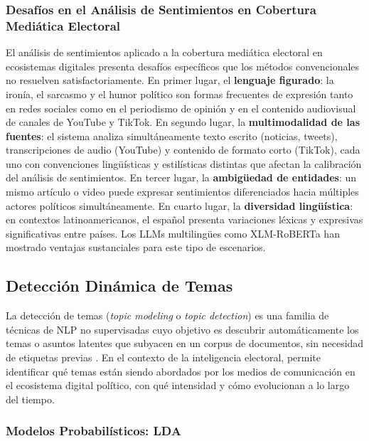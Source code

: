 \subsubsection{Desafíos en el Análisis de Sentimientos en Cobertura Mediática Electoral}

El análisis de sentimientos aplicado a la cobertura mediática electoral en ecosistemas digitales presenta desafíos específicos que los métodos convencionales no resuelven satisfactoriamente. En primer lugar, el \textbf{lenguaje figurado}: la ironía, el sarcasmo y el humor político son formas frecuentes de expresión tanto en redes sociales como en el periodismo de opinión y en el contenido audiovisual de canales de YouTube y TikTok. En segundo lugar, la \textbf{multimodalidad de las fuentes}: el sistema analiza simultáneamente texto escrito (noticias, tweets), transcripciones de audio (YouTube) y contenido de formato corto (TikTok), cada uno con convenciones lingüísticas y estilísticas distintas que afectan la calibración del análisis de sentimientos. En tercer lugar, la \textbf{ambigüedad de entidades}: un mismo artículo o video puede expresar sentimientos diferenciados hacia múltiples actores políticos simultáneamente. En cuarto lugar, la \textbf{diversidad lingüística}: en contextos latinoamericanos, el español presenta variaciones léxicas y expresivas significativas entre países. Los LLMs multilingües como XLM-RoBERTa han mostrado ventajas sustanciales para este tipo de escenarios.

\subsection{Detección Dinámica de Temas}

La detección de temas (\textit{topic modeling} o \textit{topic detection}) es una familia de técnicas de NLP no supervisadas cuyo objetivo es descubrir automáticamente los temas o asuntos latentes que subyacen en un corpus de documentos, sin necesidad de etiquetas previas \parencite{mc_blei2012lda}. En el contexto de la inteligencia electoral, permite identificar qué temas están siendo abordados por los medios de comunicación en el ecosistema digital político, con qué intensidad y cómo evolucionan a lo largo del tiempo.

\subsubsection{Modelos Probabilísticos: LDA}

